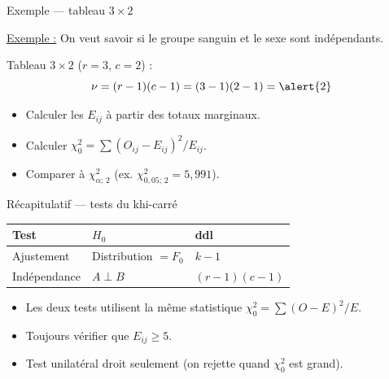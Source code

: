 \documentclass{BeamerTemplate}
\begin{document}
\begin{frame}[t]{Exemple — tableau $3 \times 2$}

\underline{Exemple :} On veut savoir si le groupe sanguin et le sexe sont indépendants.

Tableau $3 \times 2$ ($r=3$, $c=2$) :
$$\nu = (r-1)(c-1) = (3-1)(2-1) = \alert{2}$$

\bigskip
\begin{itemize}\itemsep5mm
  \item Calculer les $E_{ij}$ à partir des totaux marginaux.
  \item Calculer $\chi^2_0 = \sum (O_{ij}-E_{ij})^2/E_{ij}$.
  \item Comparer à $\chi^2_{\alpha;\,2}$ (ex. $\chi^2_{0{,}05;\,2} = 5{,}991$).
\end{itemize}

\end{frame}

\begin{frame}[t]{Récapitulatif — tests du khi-carré}

\begin{center}
\begin{tabular}{lll}\hline
\textbf{Test} & \textbf{$H_0$} & \textbf{ddl} \\ \hline
Ajustement & Distribution $= F_0$ & $k-1$ \\[4pt]
Indépendance & $A \perp B$ & $(r-1)(c-1)$ \\ \hline
\end{tabular}
\end{center}

\bigskip
\begin{itemize}\itemsep5mm
  \item Les deux tests utilisent la même statistique $\chi^2_0 = \sum(O-E)^2/E$.
  \item Toujours vérifier que $E_{ij} \ge 5$.
  \item Test unilatéral droit seulement (on rejette quand $\chi^2_0$ est \alert{grand}).
\end{itemize}

\end{frame}
\end{document}
